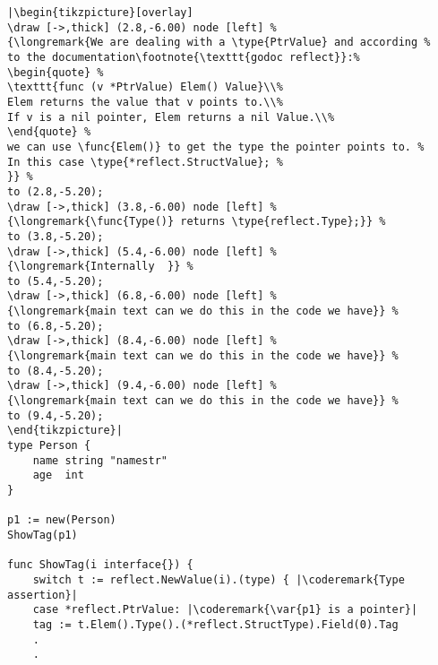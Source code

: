 \begin{lstlisting}[caption=Introspection using reflection,label=src:introspection]
|\begin{tikzpicture}[overlay]
\draw [->,thick] (2.8,-6.00) node [left] %
{\longremark{We are dealing with a \type{PtrValue} and according %
to the documentation\footnote{\texttt{godoc reflect}}:%
\begin{quote} %
\texttt{func (v *PtrValue) Elem() Value}\\%
Elem returns the value that v points to.\\%
If v is a nil pointer, Elem returns a nil Value.\\%
\end{quote} %
we can use \func{Elem()} to get the type the pointer points to. %
In this case \type{*reflect.StructValue}; %
}} %
to (2.8,-5.20);
\draw [->,thick] (3.8,-6.00) node [left] %
{\longremark{\func{Type()} returns \type{reflect.Type};}} %
to (3.8,-5.20);
\draw [->,thick] (5.4,-6.00) node [left] %
{\longremark{Internally  }} %
to (5.4,-5.20);
\draw [->,thick] (6.8,-6.00) node [left] %
{\longremark{main text can we do this in the code we have}} %
to (6.8,-5.20);
\draw [->,thick] (8.4,-6.00) node [left] %
{\longremark{main text can we do this in the code we have}} %
to (8.4,-5.20);
\draw [->,thick] (9.4,-6.00) node [left] %
{\longremark{main text can we do this in the code we have}} %
to (9.4,-5.20);
\end{tikzpicture}|
type Person {
    name string "namestr"
    age  int
}

p1 := new(Person)
ShowTag(p1)

func ShowTag(i interface{}) {
    switch t := reflect.NewValue(i).(type) { |\coderemark{Type assertion}|
    case *reflect.PtrValue: |\coderemark{\var{p1} is a pointer}|
	tag := t.Elem().Type().(*reflect.StructType).Field(0).Tag
	.
	.
\end{lstlisting}
